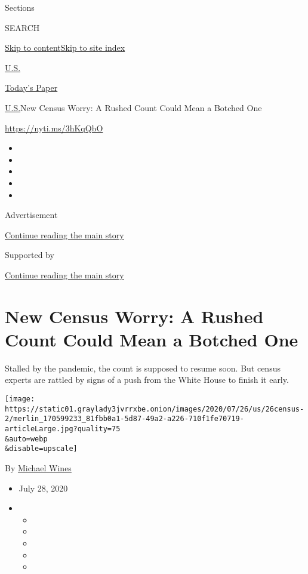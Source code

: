 Sections

SEARCH

\protect\hyperlink{site-content}{Skip to
content}\protect\hyperlink{site-index}{Skip to site index}

\href{https://www.nytimes3xbfgragh.onion/section/us}{U.S.}

\href{https://myaccount.nytimes3xbfgragh.onion/auth/login?response_type=cookie\&client_id=vi}{}

\href{https://www.nytimes3xbfgragh.onion/section/todayspaper}{Today's
Paper}

\href{/section/us}{U.S.}\textbar{}New Census Worry: A Rushed Count Could
Mean a Botched One

\url{https://nyti.ms/3hKqQbO}

\begin{itemize}
\item
\item
\item
\item
\item
\end{itemize}

Advertisement

\protect\hyperlink{after-top}{Continue reading the main story}

Supported by

\protect\hyperlink{after-sponsor}{Continue reading the main story}

\hypertarget{new-census-worry-a-rushed-count-could-mean-a-botched-one}{%
\section{New Census Worry: A Rushed Count Could Mean a Botched
One}\label{new-census-worry-a-rushed-count-could-mean-a-botched-one}}

Stalled by the pandemic, the count is supposed to resume soon. But
census experts are rattled by signs of a push from the White House to
finish it early.

\texttt{[image: https://static01.graylady3jvrrxbe.onion/images/2020/07/26/us/26census-2/merlin\_170599233\_81fbb0a1-5d87-49a2-a226-710f1fe70719-articleLarge.jpg?quality=75\\\&auto=webp\\\&disable=upscale]}

By \href{https://www.nytimes3xbfgragh.onion/by/michael-wines}{Michael
Wines}

\begin{itemize}
\item
  July 28, 2020
\item
  \begin{itemize}
  \item
  \item
  \item
  \item
  \item
  \end{itemize}
\end{itemize}

